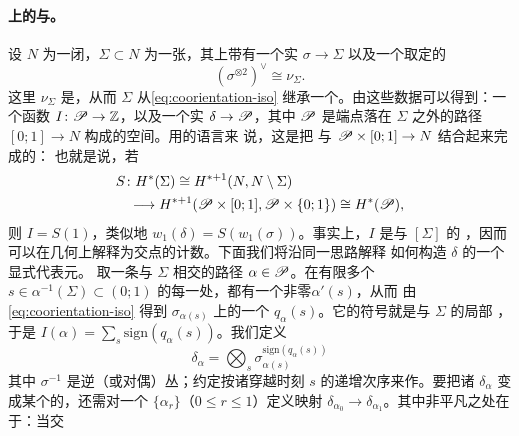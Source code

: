\paragraph{\trPathSpace{}上的\trLineBundle{}与\trSpectralFlow。}%
\label{sub:path-spaces-spectral-flow}
设 $N$ 为一闭\trManifold，$\Sigma\subset N$ 为一张\trHypersurface，其上带有一个实%
\trLineBundle{} $\sigma\to\Sigma$ 以及一个取定的\trIsomorphism
\begin{equation}\label{eq:coorientation-iso}
(\sigma^{\otimes 2})^{\vee}\cong\nu_{\Sigma}.
\end{equation}
这里 $\nu_{\Sigma}$ 是\trNormalBundle，从而 $\Sigma$ 从\eqref{eq:coorientation-iso}
继承一个\trCoorientation。由这些数据可以得到：一个\trLocallyConstant{}函数
$I\colon\mathscr{P}\to\mathbb{Z}$，以及一个实\trLineBundle{} $\delta\to\mathscr{P}$，其中 $\mathscr{P}$
是端点落在 $\Sigma$ 之外的\trSmooth{}路径 $[0;1]\to N$ 构成的空间。用\trCohomology{}的语言来
说，这是把 \trThom{}\trIsomorphism{}与\trEvaluationMap{} $\mathscr{P}\times[0;1]\to N$ 结合起来完成的：
也就是说，若
\begin{equation*}
\begin{split}
S\colon H^*(\Sigma)\cong H^{*+1}(N,N\setminus\Sigma)\qquad\qquad\qquad\qquad\\
\longrightarrow H^{*+1}(\mathscr{P}\times[0;1],\mathscr{P}\times\{0;1\})\cong H^*(\mathscr{P}),
\end{split}
\end{equation*}
则 $I=S(1)$，类似地 $w_1(\delta)=S(w_1(\sigma))$。事实上，$I$ 是与 $[\Sigma]$ 的%
\trIntersectionNumber，因而可以在几何上解释为交点的计数。下面我们将沿同一思路解释
如何构造 $\delta$ 的一个显式代表元。
取一条与 $\Sigma$ \trTransverse{}相交的路径 $\alpha\in\mathscr{P}$。在有限多个\trCrossing{}
$s\in\alpha^{-1}(\Sigma)\subset(0;1)$ 的每一处，都有一个非零\trNormalVector $\alpha'(s)$，从而
由\eqref{eq:coorientation-iso} 得到 $\sigma_{\alpha(s)}$ 上的一个\trNondegenerate%
\trQuadraticForm{} $q_{\alpha}(s)$。它的符号就是与 $\Sigma$ 的局部%
\trIntersectionNumber，于是 $I(\alpha)=\sum_s\mathrm{sign}(q_{\alpha}(s))$。我们定义
\begin{equation}\label{eq:delta-alpha}
\delta_{\alpha}=\bigotimes_s\sigma_{\alpha(s)}^{\mathrm{sign}(q_{\alpha}(s))}
\end{equation}
其中 $\sigma^{-1}$ 是逆（或对偶）丛；约定\trTensorProduct{}按诸穿越时刻 $s$
的递增次序来作。要把诸 $\delta_{\alpha}$ 变成某个\trLineBundle{}的\trFiber，还需对一个%
\trGeneric{}\trHomotopy{} $\{\alpha_r\}$（$0\le r\le 1$）定义\trParallelTransport{}映射
$\delta_{\alpha_0}\to\delta_{\alpha_1}$。其中非平凡之处在于：当交
